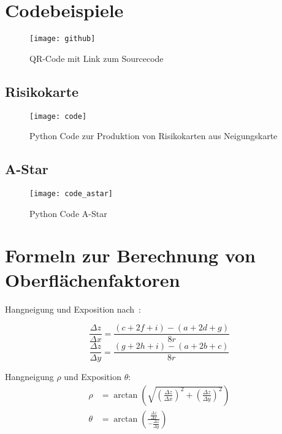 
\section{Codebeispiele}\label{app:sourcecode}
\begin{figure}[H]
  \centering
  \texttt{[image: github]}
  \caption{QR-Code mit Link zum Sourcecode}\label{fig:qrlinksrc}
\end{figure}

\subsection{Risikokarte}
\begin{figure}[H]
  \centering
  \texttt{[image: code]}
  \caption{Python Code zur Produktion von Risikokarten aus Neigungskarte}\label{fig:python}
\end{figure}
\subsection{A-Star}
\begin{figure}[H]
  \centering
  \texttt{[image: code\_astar]}
  \caption{Python Code A-Star}\label{fig:pythonastar}
\end{figure}



\pagebreak
\section{Formeln zur Berechnung von Oberflächenfaktoren}\label{app:formeln}
Hangneigung und Exposition nach~\cite{gisslopeaspect}:

\begin{equation} \label{eq1}
  \frac{\Delta z}{\Delta x} = \frac{(c + 2f + i) - (a + 2d + g)}{8r}
\end{equation}
\begin{equation} \label{eq2}
  \frac{\Delta z}{\Delta y} = \frac{(g + 2h + i) - (a + 2b + c)}{8r}
\end{equation}

Hangneigung $\rho$ und Exposition $\theta$:
\begin{align}
  \rho &= \arctan \left( \sqrt{
    {\left( \frac{\Delta z}{\Delta x}\right)}^2 + 
    {\left(\frac{\Delta z}{\Delta y}\right)}^2}
  \right)\\
  \theta &= \arctan\left(\frac{\frac{\Delta z}{\Delta x}}{-\frac{\Delta z}{\Delta y}}\right)
\end{align}

